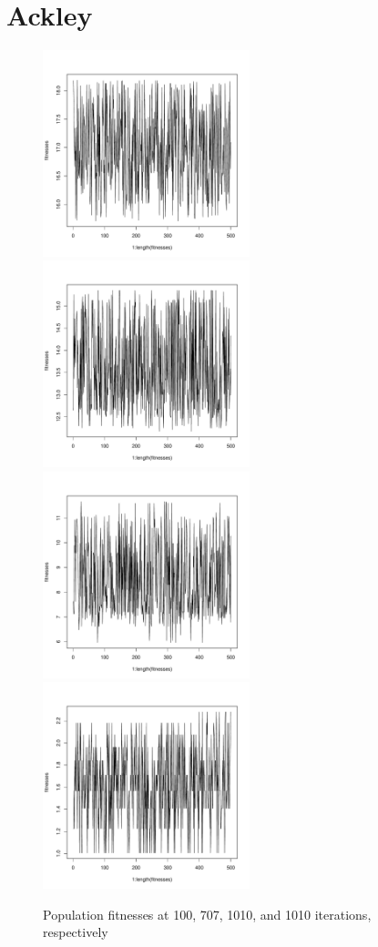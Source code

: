 \documentclass[12pt]{article}
\begin{document}
\section{Ackley}
\begin{figure}[!h]
        \begin{center}
		\includegraphics[width=60mm]{images/ackley.ss/ind_202.pdf}
		\includegraphics[width=60mm]{images/ackley.ss/ind_404.pdf}
		\includegraphics[width=60mm]{images/ackley.ss/ind_606.pdf}
		\includegraphics[width=60mm]{images/ackley.ss/ind_1010.pdf}
               	\caption{Population fitnesses at 100, 707, 1010, and 1010 iterations, respectively}
                \label{ackley_ss_pop_fit}
        \end{center}
\end{figure}
\end{document}
